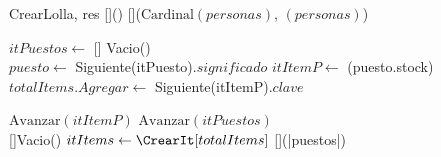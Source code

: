 \documentclass[../main.tex]{subfiles}
\begin{document}
\begin{algoritmos}
    {
    \begin{implementacion}{CrearLolla}{, }{res}{\estrLolla}
    []{\Vacio()} %
    []{\Vacio($\text{Cardinal}(personas)$, $(personas)$)} %


    \State $itPuestos \gets$ \CrearIt[puestos]
    []  Vacio()  \\
      
    \State $puesto \gets$ Siguiente(itPuesto).$significado$ 
    \State $itItemP \gets$ \CrearIt(puesto.stock) 
        
        \State $totalItems.Agregar \gets$ Siguiente(itItemP).$clave$
    \EndIf
    
    \State $\text{Avanzar}(itItemP)$ 
    \EndWhile
    \State $\text{Avanzar}(itPuestos)$ 
    \EndWhile
    \\
    
      []{Vacio()}
    \State $itItems \gets \CrearIt[totalItems]$ 
     
    []{\Vacio(|puestos|)} 


\end{implementacion}}
\end{algoritmos}
\end{document}
